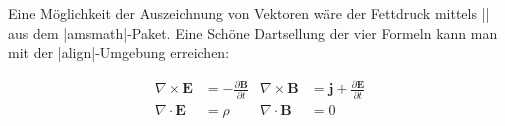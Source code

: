 % 

Eine Möglichkeit der Auszeichnung von Vektoren wäre der Fettdruck mittels |\pmb| aus dem |amsmath|-Paket. Eine Schöne Dartsellung der vier Formeln kann man mit der |align|-Umgebung erreichen:                                                                                                                                
\begin{LTXexample}                                                                                                                                                                                                                                                                                                             
\begin{align*}                                                                                                                                                                                                                                                                                                                 
  \nabla \times \pmb E &= -\frac{\partial \pmb B}{\partial t} &                                                                                                                                                                                                                                                                
  \nabla \times \pmb B &= \pmb j + \frac{\partial \pmb E}{\partial t}\\                                                                                                                                                                                                                                                        
  \nabla \cdot \pmb E &= \rho &                                                                                                                                                                                                                                                                                                
  \nabla \cdot \pmb B &= 0                                                                                                                                                                                                                                                                                                     
\end{align*}
\end{LTXexample}
